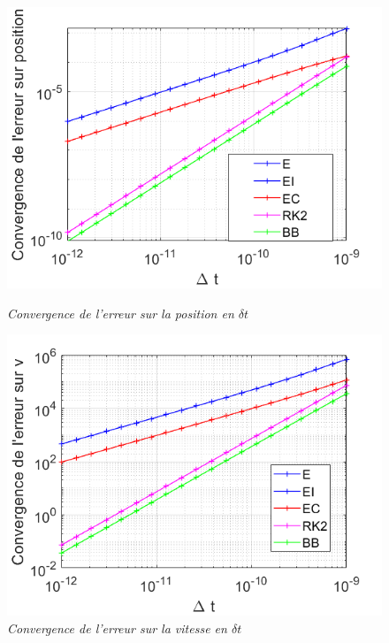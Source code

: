 \documentclass[a4paper,12pt,twoside]{article}
\begin{document}
		\begin{figure}[h]
			\begin{minipage}[c]{.46\linewidth}
				\centering
				\includegraphics[scale = 0.6]{Convergence_erreur_position_tous_integrateurs.png}
				\caption{\em\label{Fig:Convergence erreur position} Convergence de l'erreur sur la position en $\delta t$}
			\end{minipage}
			\hfill%
			\begin{minipage}[c]{.46\linewidth}
				\centering
				\includegraphics[scale = 0.6]{Convergence_erreur_vitesse_tous_integrateurs.png}
				\caption{\em\label{Fig: Convergence erreur vitesse} Convergence de l'erreur sur la vitesse en $\delta t$}
			\end{minipage}
		\end{figure}
\end{document}
